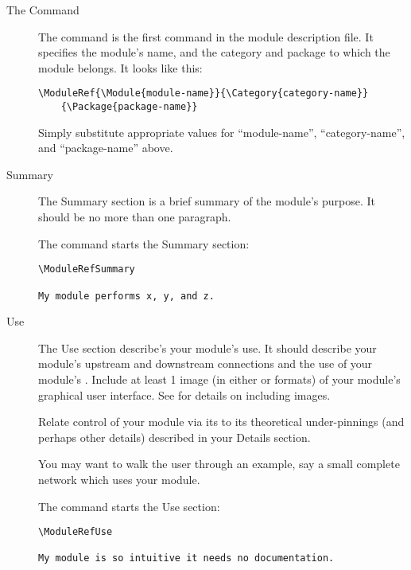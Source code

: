 \documentclass[11pt]{article}
\begin{document}
\begin{description}
\item[The  Command]\mbox{}
  
  The  command is the first command in the
  module description file.  It specifies the module's
  name, and the category and package to which the module belongs.  It
  looks like this:

\begin{verbatim}
\ModuleRef{\Module{module-name}}{\Category{category-name}}
    {\Package{package-name}}
\end{verbatim}
  
  Simply substitute appropriate values for ``module-name'',
  ``category-name'', and ``package-name'' above.

\item[Summary]
  \label{sec:summary} \mbox{}

  The Summary section is a brief summary of the module's purpose.  It
  should be no more than one paragraph.

  The  command starts the Summary section:

\begin{verbatim}
\ModuleRefSummary

My module performs x, y, and z.     
\end{verbatim}

\item[Use] \label{sec:use} \mbox{}
  
  The Use section describe's your module's use.  It should describe your
  module's upstream and downstream connections and the use of your module's
  \gui{}.  Include at least 1 image (in either  or
   formats) of your module's graphical user
  interface.  See  for details on
  including images.
  
  Relate control of your module via its \gui{} to its theoretical
  under-pinnings (and perhaps other details) described in your
  Details section.
  
  You may want to walk the user through an example, say a small
  complete network which uses your module.

  The  command starts the Use section:
  
\begin{verbatim}
\ModuleRefUse

My module is so intuitive it needs no documentation.
\end{verbatim}


\end{description}
\end{document}
